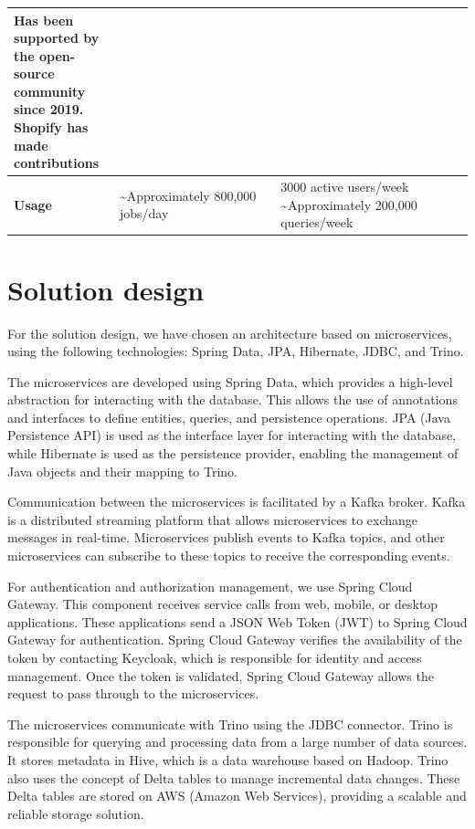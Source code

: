 \begin{longtable}{|p{0.23\linewidth}|p{0.35\linewidth}|p{0.42\linewidth}|}
Has been supported by the open-source community since 2019. Shopify has made contributions \\ \hline
\textbf{Usage} & 
\textasciitilde Approximately 800,000 jobs/day &
3000 active users/week \newline
\textasciitilde Approximately 200,000 queries/week \\ \hline
\end{longtable}

\section{Solution design}

For the solution design, we have chosen an architecture based on microservices, using the following technologies: Spring Data, JPA, Hibernate, JDBC, and Trino.

The microservices are developed using Spring Data, which provides a high-level abstraction for interacting with the database. This allows the use of annotations and interfaces to define entities, queries, and persistence operations. JPA (Java Persistence API) is used as the interface layer for interacting with the database, while Hibernate is used as the persistence provider, enabling the management of Java objects and their mapping to Trino.

Communication between the microservices is facilitated by a Kafka broker. Kafka is a distributed streaming platform that allows microservices to exchange messages in real-time. Microservices publish events to Kafka topics, and other microservices can subscribe to these topics to receive the corresponding events.

For authentication and authorization management, we use Spring Cloud Gateway. This component receives service calls from web, mobile, or desktop applications. These applications send a JSON Web Token (JWT) to Spring Cloud Gateway for authentication. Spring Cloud Gateway verifies the availability of the token by contacting Keycloak, which is responsible for identity and access management. Once the token is validated, Spring Cloud Gateway allows the request to pass through to the microservices.

The microservices communicate with Trino using the JDBC connector. Trino is responsible for querying and processing data from a large number of data sources. It stores metadata in Hive, which is a data warehouse based on Hadoop. Trino also uses the concept of Delta tables to manage incremental data changes. These Delta tables are stored on AWS (Amazon Web Services), providing a scalable and reliable storage solution.

